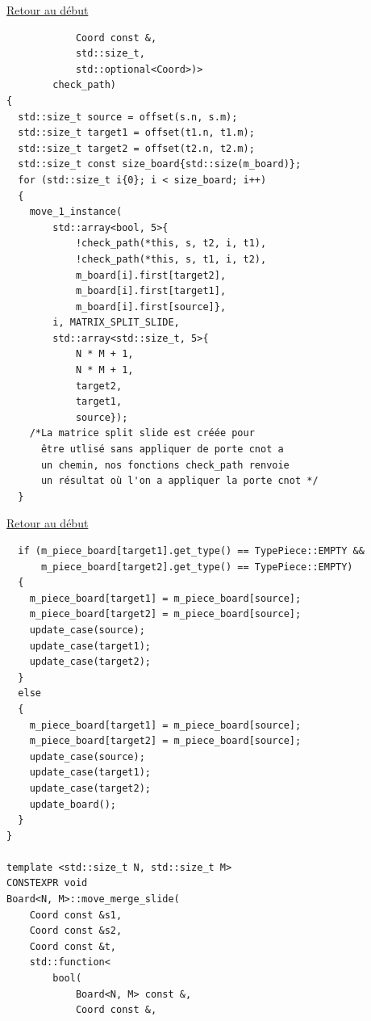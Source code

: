 {\begin{frame}[fragile]
\hyperlink{conclusion}{Retour au début}\newline
\begin{verbatim}
            Coord const &,
            std::size_t,
            std::optional<Coord>)>
        check_path)
{
  std::size_t source = offset(s.n, s.m);
  std::size_t target1 = offset(t1.n, t1.m);
  std::size_t target2 = offset(t2.n, t2.m);
  std::size_t const size_board{std::size(m_board)};
  for (std::size_t i{0}; i < size_board; i++)
  {
    move_1_instance(
        std::array<bool, 5>{
            !check_path(*this, s, t2, i, t1),
            !check_path(*this, s, t1, i, t2),
            m_board[i].first[target2],
            m_board[i].first[target1],
            m_board[i].first[source]},
        i, MATRIX_SPLIT_SLIDE,
        std::array<std::size_t, 5>{
            N * M + 1,
            N * M + 1,
            target2,
            target1,
            source});
    /*La matrice split slide est créée pour
      être utlisé sans appliquer de porte cnot a
      un chemin, nos fonctions check_path renvoie
      un résultat où l'on a appliquer la porte cnot */
  }
\end{verbatim}
\end{frame}

\begin{frame}[fragile]
\hyperlink{conclusion}{Retour au début}\newline
\begin{verbatim}
  if (m_piece_board[target1].get_type() == TypePiece::EMPTY &&
      m_piece_board[target2].get_type() == TypePiece::EMPTY)
  {
    m_piece_board[target1] = m_piece_board[source];
    m_piece_board[target2] = m_piece_board[source];
    update_case(source);
    update_case(target1);
    update_case(target2);
  }
  else
  {
    m_piece_board[target1] = m_piece_board[source];
    m_piece_board[target2] = m_piece_board[source];
    update_case(source);
    update_case(target1);
    update_case(target2);
    update_board();
  }
}

template <std::size_t N, std::size_t M>
CONSTEXPR void
Board<N, M>::move_merge_slide(
    Coord const &s1,
    Coord const &s2,
    Coord const &t,
    std::function<
        bool(
            Board<N, M> const &,
            Coord const &,
\end{verbatim}
\end{frame}

}
